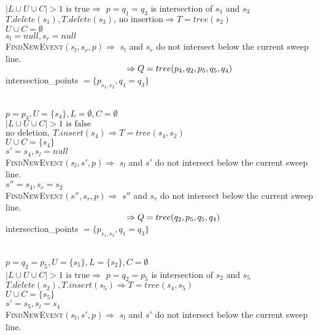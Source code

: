\documentclass[english, fontsize=12pt, paper=a4, twoside=false, draft=true, pagesize=auto, version=last, DIV=16]{scrartcl}
\theoremstyle{break}
\begin{document}
$|L \cup U \cup C|>1 \text{ is true} \Rightarrow $ $p = q_1=q_3$ is intersection of $s_1$ and $s_3$ \\
$T.delete(s_1), T.delete(s_3) \text{, no insertion} \Rightarrow T=tree(s_2)$ \\
$U \cup C=\emptyset$ \\
$s_l=null, s_r=null$ \\
{\scshape{FindNewEvent}}$(s_l,s_r,p) \Rightarrow$ $s_l$ and $s_r$ do not intersect below the current sweep line. \\
$\hspace*{49.5mm} \Rightarrow Q=tree(p_4,q_2,p_5,q_5,q_4)$ \\
intersection\_points $= \{p_{s_1,s_2},q_1=q_3\}$ \par
\vspace*{-3mm}
\hrulefill \\
$p = p_4, U = \{s_4\}, L=\emptyset, C=\emptyset$ \\
$|L \cup U \cup C|>1 \text{ is false}$ \\
$\text{no deletion}, \ T.insert(s_4) \Rightarrow T=tree(s_4,s_2)$ \\
$U \cup C=\{s_4\}$ \\
$s'=s_4, s_l=null$ \\
{\scshape{FindNewEvent}}$(s_l,s',p) \Rightarrow$ $s_l$ and $s'$ do not intersect below the current sweep line. \\
$s''=s_4, s_r=s_2$ \\
{\scshape{FindNewEvent}}$(s'',s_r,p) \Rightarrow$ $s''$ and $s_r$ do not intersect below the current sweep line. \\
$\hspace*{49.5mm} \Rightarrow Q=tree(q_2,p_5,q_5,q_4)$ \\
intersection\_points $= \{p_{s_1,s_2},q_1=q_3\}$ \par
\vspace*{-3mm}
\hrulefill \\
$p = q_2=p_5, U = \{s_5\}, L=\{s_2\}, C=\emptyset$ \\
$|L \cup U \cup C|>1 \text{ is true} \Rightarrow $ $p = q_2=p_5$ is intersection of $s_2$ and $s_5$ \\
$T.delete(s_2), T.insert(s_5) \Rightarrow T=tree(s_4,s_5)$ \\
$U \cup C=\{s_5\}$ \\
$s'=s_5, s_l=s_4$ \\
{\scshape{FindNewEvent}}$(s_l,s',p) \Rightarrow$ $s_l$ and $s'$ do not intersect below the current sweep line. \\
\end{document}
